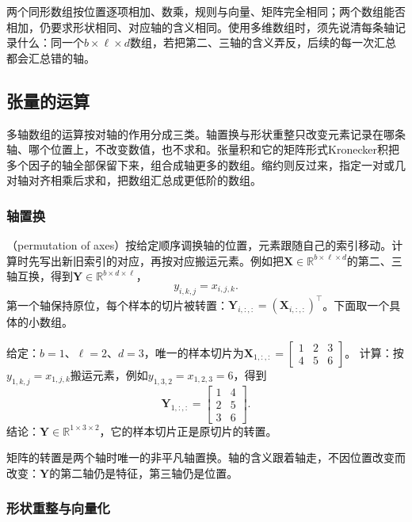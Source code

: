 两个同形数组按位置逐项相加、数乘，规则与向量、矩阵完全相同；两个数组能否相加，仍要求形状相同、对应轴的含义相同。使用多维数组时，须先说清每条轴记录什么：同一个$b\times\ell\times d$数组，若把第二、三轴的含义弄反，后续的每一次汇总都会汇总错的轴。

\subsection{张量的运算}
\label{sec:ls-tensor-operations}

多轴数组的运算按对轴的作用分成三类。轴置换与形状重整只改变元素记录在哪条轴、哪个位置上，不改变数值，也不求和。张量积和它的矩阵形式Kronecker积把多个因子的轴全部保留下来，组合成轴更多的数组。缩约则反过来，指定一对或几对轴对齐相乘后求和，把数组汇总成更低阶的数组。

\subsubsection{轴置换}
\label{sec:ls-tensor-reshaping}
\label{sec:linear-algebra-tensors-structured-operations}

（permutation of axes）按给定顺序调换轴的位置，元素跟随自己的索引移动。计算时先写出新旧索引的对应，再按对应搬运元素。例如把$\bm X\in\mathbb R^{b\times\ell\times d}$的第二、三轴互换，得到$\bm Y\in\mathbb R^{b\times d\times\ell}$，
\[
 y_{i,k,j}=x_{i,j,k}.
\]
第一个轴保持原位，每个样本的切片被转置：$\bm Y_{i,:,:}=(\bm X_{i,:,:})^\top$。下面取一个具体的小数组。
\begin{example}[交换后两条轴]
\label{ex:ls-axis-swap}
给定：$b=1$、$\ell=2$、$d=3$，唯一的样本切片为$\bm X_{1,:,:}=\left[\begin{smallmatrix}1&2&3\\4&5&6\end{smallmatrix}\right]$。
计算：按$y_{1,k,j}=x_{1,j,k}$搬运元素，例如$y_{1,3,2}=x_{1,2,3}=6$，得到
\[
 \bm Y_{1,:,:}=\begin{bmatrix}1&4\\2&5\\3&6\end{bmatrix}.
\]
结论：$\bm Y\in\mathbb R^{1\times3\times2}$，它的样本切片正是原切片的转置。
\end{example}
矩阵的转置是两个轴时唯一的非平凡轴置换。轴的含义跟着轴走，不因位置改变而改变：$\bm Y$的第二轴仍是特征，第三轴仍是位置。

\subsubsection{形状重整与向量化}

